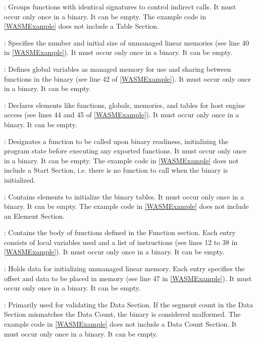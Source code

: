 : Groups functions with identical signatures to control indirect calls. It must occur only once in a binary. It can be empty. The example code in \autoref{WASMExample} does not include a Table Section.

: Specifies the number and initial size of unmanaged linear memories (see line 40 in \autoref{WASMExample}). It must occur only once in a binary. It can be empty. 

: Defines global variables as managed memory for use and sharing between functions in the \Wasm binary (see line 42 of \autoref{WASMExample}). It must occur only once in a binary. It can be empty.

: Declares elements like functions, globals, memories, and tables for host engine access (see lines 44 and 45 of \autoref{WASMExample}). It must occur only once in a binary. It can be empty.

:  Designates a function to be called upon binary readiness, initializing the \Wasm program state before executing any exported functions. It must occur only once in a binary. It can be empty. The example code in \autoref{WASMExample} does not include a Start Section, i.e. there is no function to call when the binary is initialized.

: Contains elements to initialize the binary tables. It must occur only once in a binary. It can be empty. The example code in \autoref{WASMExample} does not include an Element Section.

: Contains the body of functions defined in the Function section. Each entry consists of local variables used and a list of instructions (see lines 12 to 38 in \autoref{WASMExample}). It must occur only once in a binary. It can be empty.

: Holds data for initializing unmanaged linear memory. Each entry specifies the offset and data to be placed in memory (see line 47 in \autoref{WASMExample}). It must occur only once in a binary. It can be empty.

: Primarily used for validating the Data Section. If the segment count in the Data Section mismatches the Data Count, the binary is considered malformed. The example code in \autoref{WASMExample} does not include a Data Count Section.
It must occur only once in a binary. It can be empty.


